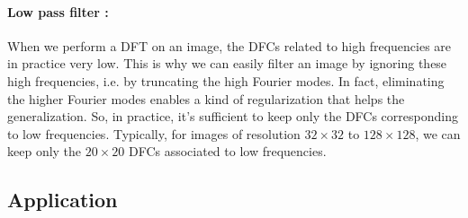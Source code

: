 \paragraph{Low pass filter :}


When we perform a DFT on an image, the DFCs related to high frequencies are in practice very low. This is why we can easily filter an image by ignoring these high frequencies, i.e. by truncating the high Fourier modes. In fact, eliminating the higher Fourier modes enables a kind of regularization that helps the generalization. So, in practice, it's sufficient to keep only the DFCs corresponding to low frequencies. Typically, for images of resolution $32\times 32$ to $128\times 128$, we can keep only the $20\times 20$ DFCs associated to low frequencies.


\subsection{Application}


